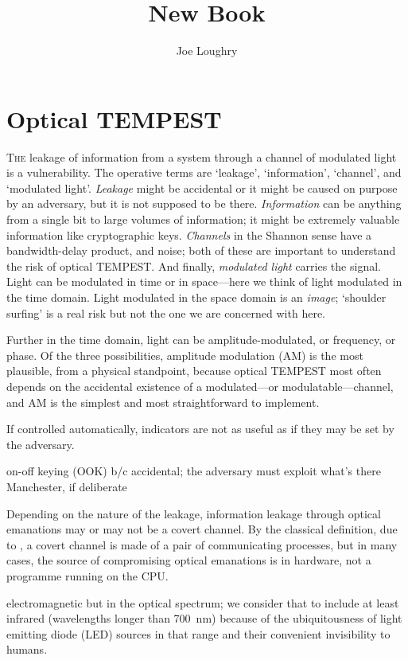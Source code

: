 \documentclass[a4paper,twoside]{book}
\begin{document}
\title{New Book}
\author{Joe Loughry}
\setcounter{chapter}{6} %
\setcounter{page}{99} %
\chapter{Optical TEMPEST}
\lettrine[lines=3]{T}{he} leakage of information from a system through a
channel of modulated light is a vulnerability. The operative terms are `leakage',
`information', `channel', and `modulated light'. \emph{Leakage} might be
accidental or it might be caused on purpose by an adversary, but it is not
supposed to be there. \emph{Information} can be anything from a single bit to
large volumes of information; it might be extremely valuable information like
cryptographic keys. \emph{Channels} in the Shannon sense\cite{Shannon1948}
have a bandwidth-delay product, and noise; both of these are important to
understand the risk of optical TEMPEST. And finally, \emph{modulated light}
carries the signal. Light can be modulated in time or in space---here we think of
light modulated in the time domain. Light modulated in the space domain is an
\emph{image}; `shoulder surfing' is a real risk but not the one we are
concerned with here.

Further in the time domain, light can be amplitude-modulated, or frequency, or
phase. Of the three possibilities, amplitude modulation (AM) is the most
plausible, from a physical standpoint, because optical TEMPEST most often
depends on the accidental existence of a modulated---or modulatable---channel,
and AM is the simplest and most straightforward to implement.

If controlled automatically, indicators are not as useful as if they may be set
by the adversary.

on-off keying (OOK) b/c accidental; the adversary must exploit what's there
Manchester, if deliberate

Depending on the nature of the leakage, information leakage through optical
emanations may or may not be a covert channel. By the classical definition,
due to \cite{Lampson1973}, a covert channel is made of a pair of communicating
processes, but in many cases, the source of compromising optical emanations
is in hardware, not a programme running on the CPU.

electromagnetic but in the optical spectrum; we consider that to include at
least infrared (wavelengths longer than \SI{700}{\nano\metre}) because of the
ubiquitousness of light emitting diode (LED) sources in that range and their
convenient invisibility to humans.
\end{document}
